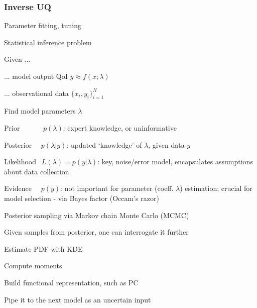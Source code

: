 \begin{frame}[t] \label{bayes} \frametitle{Inverse UQ}

\bi
\item Parameter fitting, tuning
\item Statistical inference problem
\item Given ...
\bi
\item ... model output QoI $y \approx f(x;\lambda)$
\item ... observational data $\{x_i,y_i\}_{i=1}^N$
\item Find model parameters $\lambda$
\ei
\ei
\vspace*{-0.33cm}

{
\bi
\bigskip
\item Prior $\qquad\quad p(\lambda)$: expert knowledge, or uninformative
\item Posterior $\quad p(\lambda|y)$: updated `knowledge' of $\lambda$, given data $y$
\item Likelihood $\:\: L(\lambda)=p(y|\lambda)$: key, noise/error model, encapsulates assumptions about data collection
\item Evidence $\quad p(y)$: not important for parameter (coeff. $\lambda$) estimation; crucial for model selection - via Bayes factor (Occam's razor)
\ei
}

{
\vspace*{1cm}
\bi
\item Posterior sampling via Markov chain Monte Carlo (MCMC)
\item Given samples from posterior, one can interrogate it further
\bi
\item Estimate PDF with KDE
\item Compute moments
\item Build functional representation, such as PC
\item Pipe it to the next model as an uncertain input
\ei
\ei
}


\vspace*{-7cm}
\hspace*{7cm}


\end{frame}

